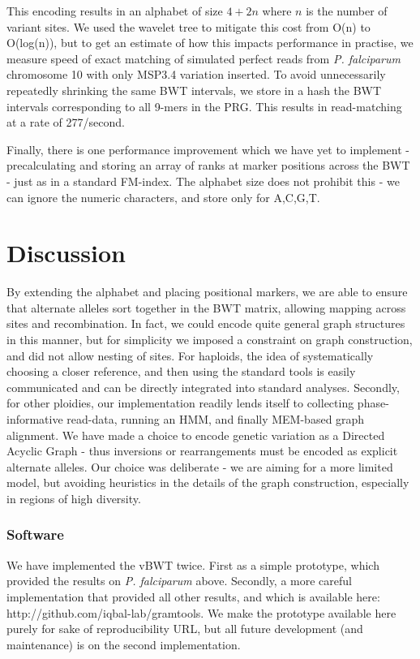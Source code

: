 \documentclass[runningheads,a4paper]{llncs}
\begin{document}
This encoding results in an alphabet of size $4+2n$ where $n$ is the number of variant sites. We used the wavelet tree to mitigate this cost from O(n) to O(log(n)), but to get an estimate of how this impacts performance in practise, we measure speed of exact matching of simulated perfect reads from \textit{P. falciparum} chromosome 10 with only MSP3.4 variation inserted. To avoid unnecessarily repeatedly shrinking the same BWT intervals, we store  in a hash the  BWT intervals corresponding to all 9-mers in the PRG. This results in read-matching at a rate of 277/second.



Finally, there is one performance improvement which we have yet to implement - precalculating and storing an array of ranks at marker positions across the BWT - just as in a standard FM-index. The alphabet size does not prohibit this - we can ignore the numeric characters, and store only for A,C,G,T. 

\section{Discussion}
By extending the alphabet and placing positional markers, we are able to ensure that alternate alleles sort together in the BWT matrix, allowing mapping across sites and recombination. In fact, we could encode quite general graph structures in this manner, but for simplicity we imposed a constraint on graph construction, and did not allow nesting of sites. For haploids, the idea of systematically choosing a closer reference, and then using the standard tools is easily communicated and can be directly integrated into standard analyses. Secondly, for other ploidies, our implementation readily lends itself to collecting phase-informative read-data, running an HMM, and finally MEM-based graph alignment. We have made a choice to encode genetic variation as a Directed Acyclic Graph - thus inversions or rearrangements must be encoded as explicit alternate alleles. Our choice was deliberate - we are aiming for a more limited model, but avoiding heuristics in the details of the graph construction, especially in regions of high diversity. 






\subsubsection{Software}
We have implemented the vBWT twice. First as a simple prototype, which provided the results on \textit{P. falciparum} above. Secondly,  a more careful implementation that provided all other results, and which is available here: http://github.com/iqbal-lab/gramtools. We make the prototype available here purely for sake of reproducibility URL, but all future development (and maintenance) is on the second implementation.
\end{document}
